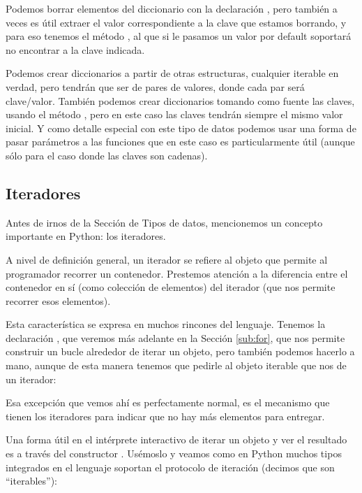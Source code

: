 
Podemos borrar elementos del diccionario con la declaración , pero también a veces es útil extraer el valor correspondiente a la clave que estamos borrando, y para eso tenemos el método , al que si le pasamos un valor por default soportará no encontrar a la clave indicada.


Podemos crear diccionarios a partir de otras estructuras, cualquier iterable en verdad, pero tendrán que ser de pares de valores, donde cada par será clave/valor. También podemos crear diccionarios tomando como fuente las claves, usando el método , pero en este caso las claves tendrán siempre el mismo valor inicial. Y como detalle especial con este tipo de datos podemos usar una forma de pasar parámetros a las funciones que en este caso es particularmente útil (aunque sólo para el caso donde las claves son cadenas).



\subsection{Iteradores}

Antes de irnos de la Sección de Tipos de datos, mencionemos un concepto importante en Python: los iteradores.

A nivel de definición general, un iterador se refiere al objeto que permite al programador recorrer un contenedor. Prestemos atención a la diferencia entre el contenedor en sí (como colección de elementos) del iterador (que nos permite recorrer esos elementos).

Esta característica se expresa en muchos rincones del lenguaje. Tenemos la declaración , que veremos más adelante en la Sección \ref{sub:for}, que nos permite construir un bucle alrededor de iterar un objeto, pero también podemos hacerlo a mano, aunque de esta manera tenemos que pedirle al objeto iterable que nos de un iterador:


Esa excepción que vemos ahí es perfectamente normal, es el mecanismo que tienen los iteradores para indicar que no hay más elementos para entregar.

Una forma útil en el intérprete interactivo de iterar un objeto y ver el resultado es a través del constructor . Usémoslo y veamos como en Python muchos tipos integrados en el lenguaje soportan el protocolo de iteración (decimos que son ``iterables''):

